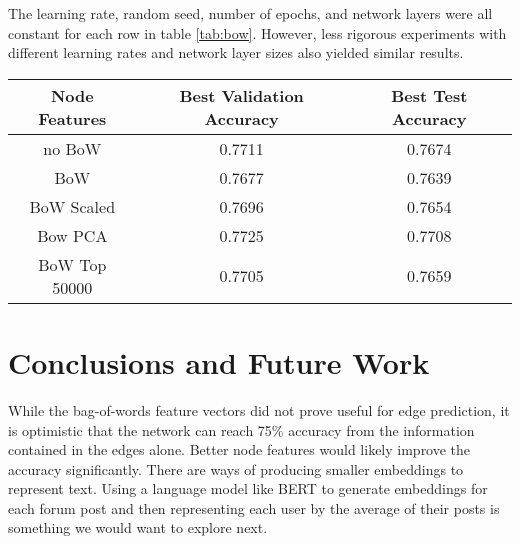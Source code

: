 \documentclass[10pt,twocolumn,letterpaper]{article}
\begin{document}
The learning rate, random seed, number of epochs, and network layers were all constant for each row in table \ref{tab:bow}.
However, less rigorous experiments with different learning rates and network layer sizes also yielded similar results.


\begin{table*}[h!]
\begin{center}
   \begin{tabular}{ |c |c |c |}
   \hline
   \bf{Node Features} & \bf{Best Validation Accuracy} & \bf{Best Test Accuracy} \\
   \hline 
   no BoW & 0.7711 & 0.7674 \\
   \hline  
   BoW & 0.7677 & 0.7639 \\
   \hline  
   BoW Scaled & 0.7696 & 0.7654 \\
   \hline  
   Bow PCA & 0.7725 & 0.7708 \\  
   \hline  
   BoW Top 50000 & 0.7705 & 0.7659 \\
   \hline
   \end{tabular}
   \end{center}
   \caption{Bag-of-Words Effect on Accuracy}
   \label{tab:bow}
\end{table*}



\section{Conclusions and Future Work}

While the bag-of-words feature vectors did not prove useful for edge prediction, it is optimistic that the network can reach 75\% accuracy from the information contained in the edges alone. Better node features would likely improve the accuracy significantly.
There are ways of producing smaller embeddings to represent text. Using a language model like BERT to generate embeddings for each forum post and then representing each user by the average of their posts is something we would want to explore next.
\end{document}
